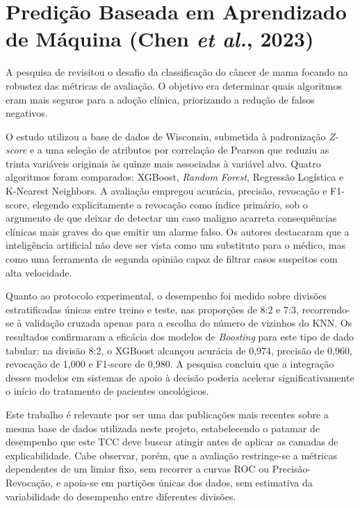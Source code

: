 \documentclass[
    12pt
    ,oneside
    ,a4paper
    ,chapter=TITLE
    ,section=TITLE
    ,sumario=abnt-6027-2012
    ,english,brazil]{abntex2} %
\begin{document}
\section{Predição Baseada em Aprendizado de Máquina (Chen \textit{et al.}, 2023)}

A pesquisa de  revisitou o desafio da classificação do câncer de mama focando na robustez das métricas de avaliação. O objetivo era determinar quais algoritmos eram mais seguros para a adoção clínica, priorizando a redução de falsos negativos.

O estudo utilizou a base de dados de Wisconsin, submetida à padronização \textit{Z-score} e a uma seleção de atributos por correlação de Pearson que reduziu as trinta variáveis originais às quinze mais associadas à variável alvo. Quatro algoritmos foram comparados: XGBoost, \textit{Random Forest}, Regressão Logística e K-Nearest Neighbors. A avaliação empregou acurácia, precisão, revocação e F1-score, elegendo explicitamente a revocação como índice primário, sob o argumento de que deixar de detectar um caso maligno acarreta consequências clínicas mais graves do que emitir um alarme falso. Os autores destacaram que a inteligência artificial não deve ser vista como um substituto para o médico, mas como uma ferramenta de segunda opinião capaz de filtrar casos suspeitos com alta velocidade.

Quanto ao protocolo experimental, o desempenho foi medido sobre divisões estratificadas únicas entre treino e teste, nas proporções de 8:2 e 7:3, recorrendo-se à validação cruzada apenas para a escolha do número de vizinhos do KNN. Os resultados confirmaram a eficácia dos modelos de \textit{Boosting} para este tipo de dado tabular: na divisão 8:2, o XGBoost alcançou acurácia de 0,974, precisão de 0,960, revocação de 1,000 e F1-score de 0,980. A pesquisa concluiu que a integração desses modelos em sistemas de apoio à decisão poderia acelerar significativamente o início do tratamento de pacientes oncológicos.

Este trabalho é relevante por ser uma das publicações mais recentes sobre a mesma base de dados utilizada neste projeto, estabelecendo o patamar de desempenho que este TCC deve buscar atingir antes de aplicar as camadas de explicabilidade. Cabe observar, porém, que a avaliação restringe-se a métricas dependentes de um limiar fixo, sem recorrer a curvas ROC ou Precisão-Revocação, e apoia-se em partições únicas dos dados, sem estimativa da variabilidade do desempenho entre diferentes divisões.
\end{document}
